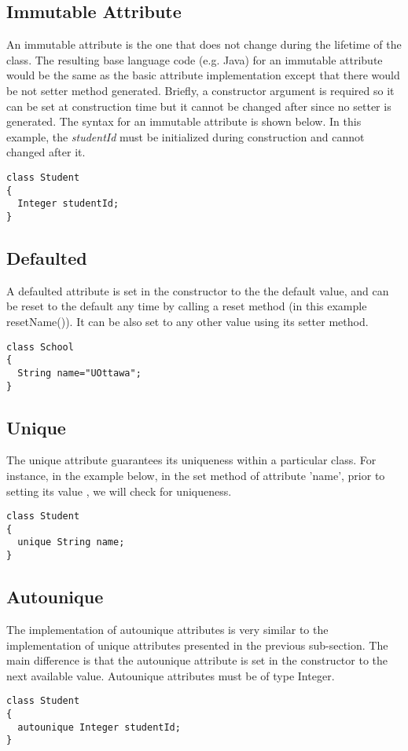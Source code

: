 \subsection{Immutable Attribute}
An immutable attribute is the one that does not change during the lifetime of the class. The resulting base language code (e.g. Java) for an immutable attribute would be the same as the basic attribute implementation except that there would be not setter method generated. Briefly, a constructor argument is required so it can be set at construction time but it cannot be changed after since no setter is generated. The syntax for an immutable attribute is shown below. In this example, the \textit{studentId} must be initialized during construction and cannot changed after it. 
\vspace{\baselineskip}
\begin{lstlisting}[style=umplePlain]
class Student 
{
  Integer studentId;
}
\end{lstlisting}

\subsection{Defaulted}
A defaulted attribute is set in the constructor to the the default value, and can be reset to the default any time by calling a reset method (in this example resetName()). It can be also set to any other value using its setter method. 
\vspace{\baselineskip}
\begin{lstlisting}[style=umplePlain]
class School 
{
  String name="UOttawa";
}
\end{lstlisting}

\subsection{Unique}
The unique attribute guarantees its uniqueness within a particular class.
For instance, in the example below, in the set method of attribute 'name', prior to setting its value , we will check for uniqueness. 
\vspace{\baselineskip}
\begin{lstlisting}[style=umplePlain]
class Student 
{
  unique String name;
}
\end{lstlisting}

\subsection{Autounique}
The implementation of autounique attributes is very similar to the implementation of unique attributes presented in the previous sub-section. The main difference is that the autounique attribute is set in the constructor to the next available value. Autounique attributes must be of type Integer.
\vspace{\baselineskip}
\begin{lstlisting}[style=umplePlain]
class Student 
{
  autounique Integer studentId;
}
\end{lstlisting}

